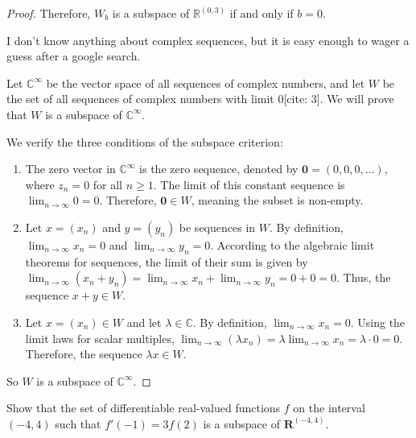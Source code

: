 \begin{proof}
		Therefore, $W_b$ is a subspace of $\mathbb{R}^{(0,3)}$ if and only if $b = 0$.
		\item[(e)]\begin{tcolorbox}[colback=yellow!20, colframe=yellow!80!black, title=My thoughts]
			I don't know anything about complex sequences, but it is easy enough to wager a guess after a google search.
		\end{tcolorbox}
		Let $\mathbb{C}^{\infty}$ be the vector space of all sequences of complex numbers, and let $W$ be the set of all sequences of complex numbers with limit $0$[cite: 3]. We will prove that $W$ is a subspace of $\mathbb{C}^{\infty}$.
		
		We verify the three conditions of the subspace criterion:
		\begin{enumerate}
			\item {} The zero vector in $\mathbb{C}^{\infty}$ is the zero sequence, denoted by $\mathbf{0} = (0, 0, 0, \dots)$, where $z_n = 0$ for all $n \geq 1$. The limit of this constant sequence is $\lim_{n \to \infty} 0 = 0$. Therefore, $\mathbf{0} \in W$, meaning the subset is non-empty.
			
			\item {} Let $x = (x_n)$ and $y = (y_n)$ be sequences in $W$. By definition, $\lim_{n \to \infty} x_n = 0$ and $\lim_{n \to \infty} y_n = 0$. According to the algebraic limit theorems for sequences, the limit of their sum is given by $\lim_{n \to \infty} (x_n + y_n) = \lim_{n \to \infty} x_n + \lim_{n \to \infty} y_n = 0 + 0 = 0$. Thus, the sequence $x + y \in W$.
			
			\item {} Let $x = (x_n) \in W$ and let $\lambda \in \mathbb{C}$. By definition, $\lim_{n \to \infty} x_n = 0$. Using the limit laws for scalar multiples, $\lim_{n \to \infty} (\lambda x_n) = \lambda \lim_{n \to \infty} x_n = \lambda \cdot 0 = 0$. Therefore, the sequence $\lambda x \in W$.
		\end{enumerate}
		
		So $W$ is a subspace of $\mathbb{C}^{\infty}$.
\end{proof}
\begin{question}
	Show that the set of differentiable real-valued functions $f$ on the interval $(-4, 4)$ such that $f'(-1) = 3f(2)$ is a subspace of $\mathbf{R}^{(-4,4)}$.
\end{question}

